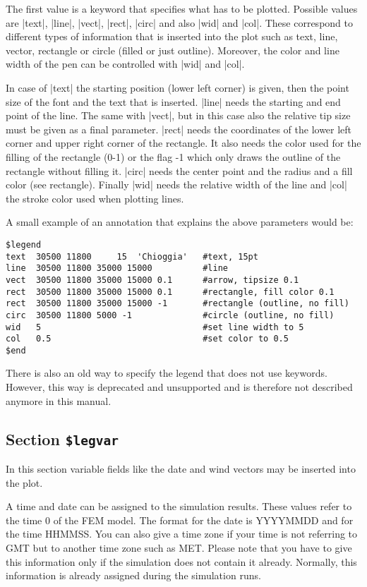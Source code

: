 The first value is a keyword that specifies what has to be plotted.
Possible values are |text|, |line|, |vect|, |rect|, |circ|  and also
|wid| and |col|. These correspond to different types of information
that is inserted into the plot such as text, line, vector, rectangle
or circle (filled or just outline). Moreover, the color and
line width of the pen can be controlled with |wid| and |col|.

In case of |text| the starting position (lower left corner) is given,
then the point size of the font and the text that is inserted. |line|
needs the starting and end point of the line. The same with |vect|,
but in this case also the relative tip size must be given as a final
parameter. |rect| needs the coordinates of the lower left corner and 
upper right corner of the rectangle. It also needs the color used for
the filling of the rectangle (0-1) or the flag -1 which only draws the
outline of the rectangle without filling it. |circ| needs the center
point and the radius and a fill color (see rectangle). Finally |wid| needs 
the relative width of the line and |col| the stroke color used when plotting
lines.

A small example of an annotation that explains the above parameters
would be:

\begin{verbatim}
$legend
text  30500 11800     15  'Chioggia'   #text, 15pt
line  30500 11800 35000 15000          #line
vect  30500 11800 35000 15000 0.1      #arrow, tipsize 0.1
rect  30500 11800 35000 15000 0.1      #rectangle, fill color 0.1
rect  30500 11800 35000 15000 -1       #rectangle (outline, no fill)
circ  30500 11800 5000 -1              #circle (outline, no fill)
wid   5                                #set line width to 5
col   0.5                              #set color to 0.5
$end
\end{verbatim}

There is also an old way to specify the legend that does not use
keywords. However, this way is deprecated and unsupported and is therefore
not described anymore in this manual.

\subsection{Section {\tt \$legvar}}


In this section variable fields like the date and wind vectors
may be inserted into the plot.

A time and date can be assigned to the simulation results. These values
refer to the time 0 of the FEM model. The format for the date is
YYYYMMDD and for the time HHMMSS. 
You can also give a time zone if your time is not referring to 
GMT but to another time zone such as MET. Please note that you have to give
this information only if the simulation does not contain it already.
Normally, this information is already assigned during the simulation runs.

